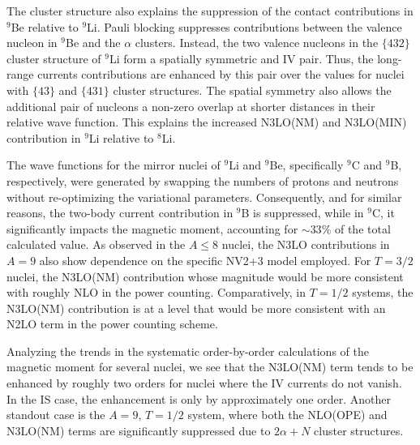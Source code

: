 \documentclass[aps,prc,floatfix,showpacs,twocolumn, preprintnumbers]{revtex4-2}
\begin{document}
The cluster structure also explains the suppression of the contact contributions in $^9$Be relative to $^9$Li. Pauli blocking suppresses contributions between the valence nucleon in $^9$Be and the $\alpha$ clusters. Instead, the two valence nucleons in the $\{432\}$ cluster structure of $^9$Li form a spatially symmetric and IV pair. Thus, the long-range currents contributions are enhanced by this pair over the values for nuclei with $\{43\}$ and $\{431\}$ cluster structures. The spatial symmetry also allows the additional pair of nucleons a non-zero overlap at shorter distances in their relative wave function. This explains the increased N3LO(NM) and N3LO(MIN) contribution in $^9$Li relative to $^8$Li.

The wave functions for the mirror nuclei of $^9$Li and $^9$Be, specifically $^9$C and $^9$B, respectively, were generated by swapping the numbers of protons and neutrons without re-optimizing the variational parameters. Consequently, and for similar reasons, the two-body current contribution in $^9$B is suppressed, while in $^9$C, it significantly impacts the magnetic moment, accounting for $\sim33\%$ of the total calculated value. As observed in the $A\le8$ nuclei, the N3LO contributions in $A=9$ also show dependence on the specific NV2+3 model employed. For $T=3/2$ nuclei, the N3LO(NM) contribution whose magnitude would be more consistent with roughly NLO in the power counting. Comparatively, in $T=1/2$ systems, the N3LO(NM) contribution is at a level that would be more consistent with an N2LO term in the power counting scheme. 

Analyzing the trends in the systematic order-by-order calculations of the magnetic moment  for several nuclei, we see that the N3LO(NM) term tends to be enhanced by roughly two orders for nuclei where the IV currents do not vanish. In the IS case, the enhancement is only by approximately one order. Another standout case is the $A=9,\,T=1/2$ system, where both the NLO(OPE) and N3LO(NM) terms are significantly suppressed due to $2\alpha + N$ cluster structures. 
\end{document}
